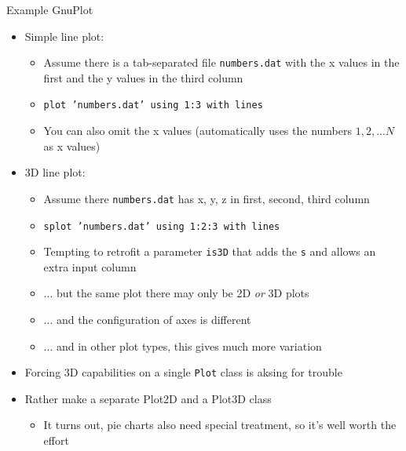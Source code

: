 \begin{frame}{Example GnuPlot}
%
\begin{itemize}
\item Simple line plot:\\
	\begin{itemize}
	\item Assume there is a tab-separated file \texttt{numbers.dat} with the x values in the first and the y values in the third column
	\item \texttt{plot 'numbers.dat' using 1:3 with lines}
	\item You can also omit the x values (automatically uses the numbers $1, 2, ... N$ as x values)
	\end{itemize}
	\pause
\item 3D line plot:\\
	\begin{itemize}
	\item Assume there \texttt{numbers.dat} has x, y, z in first, second, third column
	\item \texttt{{\color{blue}s}plot 'numbers.dat' using 1:2:3 with lines}
	\item[\Thus] Tempting to retrofit a parameter \texttt{is3D} that adds the \texttt{s} and allows an extra input column
		\pause
	\item ... but the same plot there may only be 2D \emph{or} 3D plots
	\item ... and the configuration of axes is different
	\item ... and in other plot types, this gives much more variation
	\end{itemize}
	\pause
\item[\Thus] Forcing 3D capabilities on a single \texttt{Plot} class is aksing for trouble
	\pause
\item[\Thus] Rather make a separate Plot2D and a Plot3D class
	\begin{itemize}
	\item It turns out, pie charts also need special treatment, so it's well worth the effort
	\end{itemize}
\end{itemize}
%
\end{frame}


